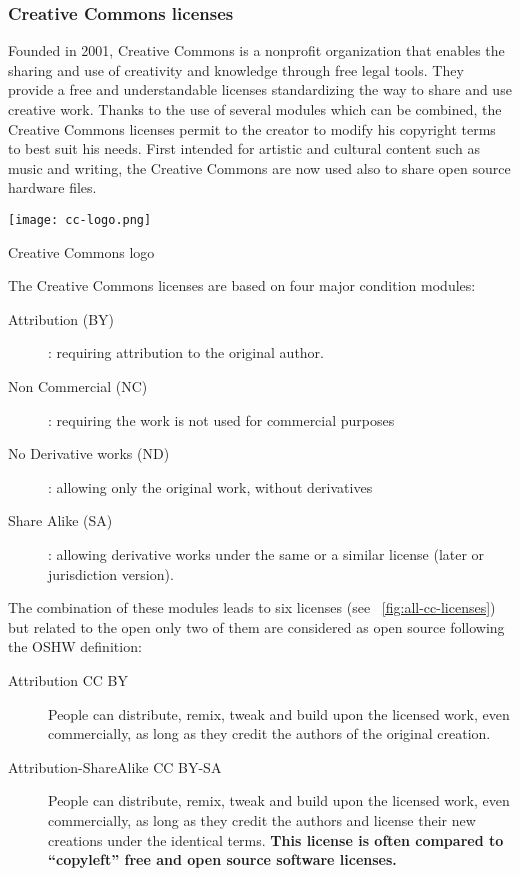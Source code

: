 \subsubsection{Creative Commons licenses} %
\begin{row}{4}{2}
    \begin{cell}{3}
        Founded in 2001, Creative Commons is a nonprofit organization that enables the sharing and use of creativity and knowledge through free legal tools. They provide a free and understandable licenses standardizing the way to share and use creative work. Thanks to the use of several modules which can be combined, the Creative Commons licenses permit to the creator to modify his copyright terms to best suit his needs. First intended for artistic and cultural content such as music and writing, the Creative Commons are now used also to share open source hardware files.
    \end{cell}
    \begin{cell}{1}
        \begin{NFfigure}
            \centering
                \texttt{[image: cc-logo.png]}
            \caption{Creative Commons logo}
            \label{fig:cc_logo}
        \end{NFfigure}
    \end{cell}
\end{row}
The Creative Commons licenses are based on four major condition modules:
\begin{description}
    \item[Attribution (BY)]: requiring attribution to the original author.
    \item[Non Commercial (NC)]: requiring the work is not used for commercial purposes
    \item[No Derivative works (ND)]: allowing only the original work, without derivatives
    \item[Share Alike (SA)]: allowing derivative works under the same or a similar license (later or jurisdiction version).
\end{description}


The combination of these modules leads to six licenses (see \figurename~\ref{fig:all-cc-licenses}) but related to the open only two of them are considered as open source following the OSHW definition:
\begin{description}
    \item[Attribution CC BY] People can distribute, remix, tweak and build upon the licensed work, even commercially, as long as they credit the authors of the original creation.
    \item[Attribution-ShareAlike CC BY-SA] People can distribute, remix, tweak and build upon the licensed work, even commercially, as long as they credit the authors and license their new creations under the identical terms. \textbf{This license is often compared to “copyleft” free and open source software licenses.}
\end{description}

